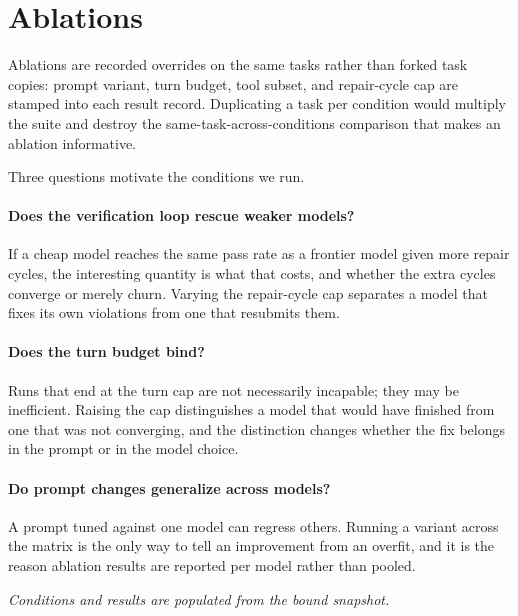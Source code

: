 \section{Ablations}
\label{sec:ablations}


Ablations are recorded overrides on the same tasks rather than forked task copies: prompt variant, turn budget, tool subset, and repair-cycle cap are stamped into each result record. Duplicating a task per condition would multiply the suite and destroy the same-task-across-conditions comparison that makes an ablation informative.

Three questions motivate the conditions we run.

\paragraph{Does the verification loop rescue weaker models?} If a cheap model reaches the same pass rate as a frontier model given more repair cycles, the interesting quantity is what that costs, and whether the extra cycles converge or merely churn. Varying the repair-cycle cap separates a model that fixes its own violations from one that resubmits them.

\paragraph{Does the turn budget bind?} Runs that end at the turn cap are not necessarily incapable; they may be inefficient. Raising the cap distinguishes a model that would have finished from one that was not converging, and the distinction changes whether the fix belongs in the prompt or in the model choice.

\paragraph{Do prompt changes generalize across models?} A prompt tuned against one model can regress others. Running a variant across the matrix is the only way to tell an improvement from an overfit, and it is the reason ablation results are reported per model rather than pooled.

\emph{Conditions and results are populated from the bound snapshot.}
